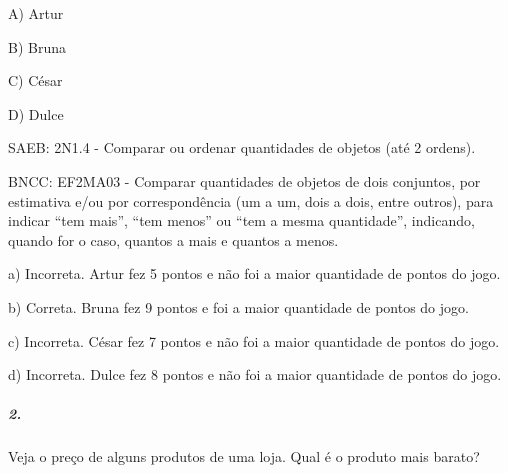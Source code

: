 A) Artur

B) Bruna

C) César

D) Dulce

SAEB: 2N1.4 - Comparar ou ordenar quantidades de objetos (até 2 ordens).

BNCC: EF2MA03 - Comparar quantidades de objetos de dois conjuntos, por
estimativa e/ou por correspondência (um a um, dois a dois, entre
outros), para indicar ``tem mais'', ``tem menos'' ou ``tem a mesma
quantidade'', indicando, quando for o caso, quantos a mais e quantos a
menos.

a) Incorreta. Artur fez 5 pontos e não foi a maior quantidade de pontos
do jogo.

b) Correta. Bruna fez 9 pontos e foi a maior quantidade de pontos do
jogo.

c) Incorreta. César fez 7 pontos e não foi a maior quantidade de pontos
do jogo.

d) Incorreta. Dulce fez 8 pontos e não foi a maior quantidade de pontos
do jogo.

\subparagraph{2. }\label{section-116}

Veja o preço de alguns produtos de uma loja. Qual é o produto mais
barato?


